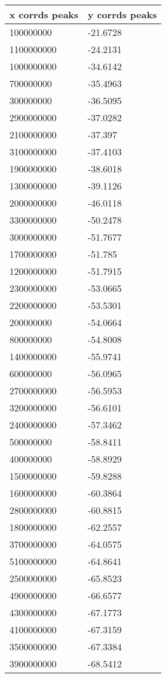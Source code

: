 \begin{tabular}{ll}
x corrds peaks & y corrds peaks \\ 
\hline 
100000000 & -21.6728 \\ 
1100000000 & -24.2131 \\ 
1000000000 & -34.6142 \\ 
700000000 & -35.4963 \\ 
300000000 & -36.5095 \\ 
2900000000 & -37.0282 \\ 
2100000000 & -37.397 \\ 
3100000000 & -37.4103 \\ 
1900000000 & -38.6018 \\ 
1300000000 & -39.1126 \\ 
2000000000 & -46.0118 \\ 
3300000000 & -50.2478 \\ 
3000000000 & -51.7677 \\ 
1700000000 & -51.785 \\ 
1200000000 & -51.7915 \\ 
2300000000 & -53.0665 \\ 
2200000000 & -53.5301 \\ 
200000000 & -54.0664 \\ 
800000000 & -54.8008 \\ 
1400000000 & -55.9741 \\ 
600000000 & -56.0965 \\ 
2700000000 & -56.5953 \\ 
3200000000 & -56.6101 \\ 
2400000000 & -57.3462 \\ 
500000000 & -58.8411 \\ 
400000000 & -58.8929 \\ 
1500000000 & -59.8288 \\ 
1600000000 & -60.3864 \\ 
2800000000 & -60.8815 \\ 
1800000000 & -62.2557 \\ 
3700000000 & -64.0575 \\ 
5100000000 & -64.8641 \\ 
2500000000 & -65.8523 \\ 
4900000000 & -66.6577 \\ 
4300000000 & -67.1773 \\ 
4100000000 & -67.3159 \\ 
3500000000 & -67.3384 \\ 
3900000000 & -68.5412 \\ 

\end{tabular}
